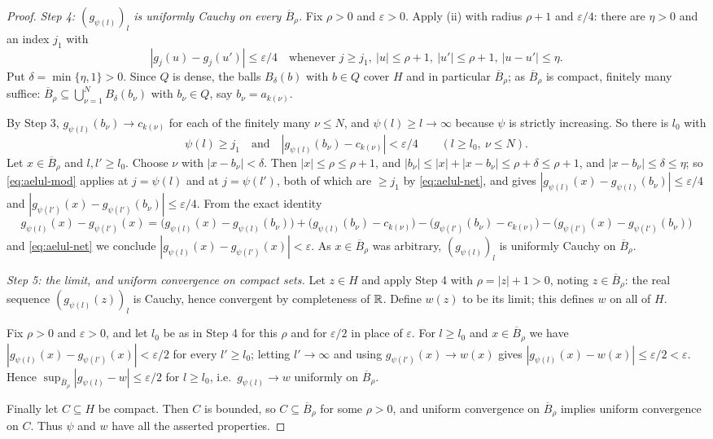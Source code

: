 \begin{proof}
\emph{Step 4: $(g_{\psi(l)})_l$ is uniformly Cauchy on every $\overline B_\rho$.}
Fix $\rho>0$ and $\varepsilon>0$. Apply (ii) with radius $\rho+1$ and
$\varepsilon/4$: there are $\eta>0$ and an index $j_1$ with
\begin{equation}\label{eq:aelul-mod}
  |g_j(u)-g_j(u')|\le\varepsilon/4\quad\text{whenever }j\ge j_1,\
  |u|\le\rho+1,\ |u'|\le\rho+1,\ |u-u'|\le\eta .
\end{equation}
Put $\delta=\min\{\eta,1\}>0$. Since $Q$ is dense, the balls $B_\delta(b)$ with
$b\in Q$ cover $H$ and in particular $\overline B_\rho$; as $\overline B_\rho$
is compact, finitely many suffice:
$\overline B_\rho\subseteq\bigcup_{\nu=1}^{N}B_\delta(b_\nu)$ with
$b_\nu\in Q$, say $b_\nu=a_{k(\nu)}$.

By Step 3, $g_{\psi(l)}(b_\nu)\to c_{k(\nu)}$ for each of the finitely many
$\nu\le N$, and $\psi(l)\ge l\to\infty$ because $\psi$ is strictly increasing.
So there is $l_0$ with
\begin{equation}\label{eq:aelul-net}
  \psi(l)\ge j_1\quad\text{and}\quad
  |g_{\psi(l)}(b_\nu)-c_{k(\nu)}|<\varepsilon/4
  \qquad(l\ge l_0,\ \nu\le N).
\end{equation}
Let $x\in\overline B_\rho$ and $l,l'\ge l_0$. Choose $\nu$ with
$|x-b_\nu|<\delta$. Then $|x|\le\rho\le\rho+1$, and
$|b_\nu|\le|x|+|x-b_\nu|\le\rho+\delta\le\rho+1$, and $|x-b_\nu|\le\delta\le\eta$;
so \eqref{eq:aelul-mod} applies at $j=\psi(l)$ and at $j=\psi(l')$, both of
which are $\ge j_1$ by \eqref{eq:aelul-net}, and gives
$|g_{\psi(l)}(x)-g_{\psi(l)}(b_\nu)|\le\varepsilon/4$ and
$|g_{\psi(l')}(x)-g_{\psi(l')}(b_\nu)|\le\varepsilon/4$. From the exact identity
\[
  g_{\psi(l)}(x)-g_{\psi(l')}(x)
   =\bigl(g_{\psi(l)}(x)-g_{\psi(l)}(b_\nu)\bigr)
    +\bigl(g_{\psi(l)}(b_\nu)-c_{k(\nu)}\bigr)
    -\bigl(g_{\psi(l')}(b_\nu)-c_{k(\nu)}\bigr)
    -\bigl(g_{\psi(l')}(x)-g_{\psi(l')}(b_\nu)\bigr)
\]
and \eqref{eq:aelul-net} we conclude
$|g_{\psi(l)}(x)-g_{\psi(l')}(x)|<\varepsilon$. As $x\in\overline B_\rho$ was
arbitrary, $(g_{\psi(l)})_l$ is uniformly Cauchy on $\overline B_\rho$.

\emph{Step 5: the limit, and uniform convergence on compact sets.}
Let $z\in H$ and apply Step 4 with $\rho=|z|+1>0$, noting $z\in\overline B_\rho$:
the real sequence $(g_{\psi(l)}(z))_l$ is Cauchy, hence convergent by
completeness of $\mathbb{R}$. Define $w(z)$ to be its limit; this defines $w$ on all of
$H$.

Fix $\rho>0$ and $\varepsilon>0$, and let $l_0$ be as in Step 4 for this $\rho$
and for $\varepsilon/2$ in place of $\varepsilon$. For $l\ge l_0$ and
$x\in\overline B_\rho$ we have $|g_{\psi(l)}(x)-g_{\psi(l')}(x)|<\varepsilon/2$
for every $l'\ge l_0$; letting $l'\to\infty$ and using
$g_{\psi(l')}(x)\to w(x)$ gives $|g_{\psi(l)}(x)-w(x)|\le\varepsilon/2
<\varepsilon$. Hence $\sup_{\overline B_\rho}|g_{\psi(l)}-w|\le\varepsilon/2$
for $l\ge l_0$, i.e.\ $g_{\psi(l)}\to w$ uniformly on $\overline B_\rho$.

Finally let $C\subseteq H$ be compact. Then $C$ is bounded, so $C\subseteq
\overline B_\rho$ for some $\rho>0$, and uniform convergence on
$\overline B_\rho$ implies uniform convergence on $C$. Thus $\psi$ and $w$ have
all the asserted properties.
\end{proof}
